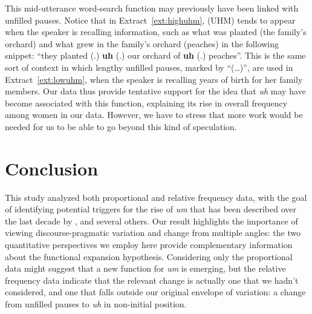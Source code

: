 \documentclass[11pt]{article}
\begin{document}
This mid-utterance word-search function may previously have been linked with
unfilled pauses.
Notice that in Extract~\ref{ext:highuhm}, (UHM) tends to appear when the speaker
is recalling information, such as what was planted (the family's orchard) and
what grew in the family's orchard (peaches) in the following snippet:
``they planted (.) \textbf{uh} (.) our orchard of \textbf{uh} (.) peaches''.
This is the same sort of context in which lengthy unfilled pauses, marked by
``(\ldots)'', are used in Extract~\ref{ext:lowuhm}, when the speaker is
recalling years of birth for her family members.
Our data thus provide tentative support for the idea that \emph{uh} may have
become associated with this function, explaining its rise in overall frequency
among women in our data.
However, we have to stress that more work would be needed for us to be able to
go beyond this kind of speculation.

\section{Conclusion}

This study analyzed both proportional and relative frequency data, with the goal
of identifying potential triggers for the rise of \emph{um} that has been
described over the last decade by \textcite{fruehwald2016},
\textcite{tottie2016} and several others.
Our result highlights the importance of viewing discourse-pragmatic variation
and change from multiple angles:
the two quantitative perspectives we employ here provide complementary
information about the functional expansion hypothesis.
Considering only the proportional data might suggest that a new function for
\emph{um} is emerging, but the relative frequency data indicate that the
relevant change is actually one that we hadn't considered, and one that falls
outside our original envelope of variation: a change from unfilled pauses to
\emph{uh} in non-initial position.


\printbibliography
\end{document}
